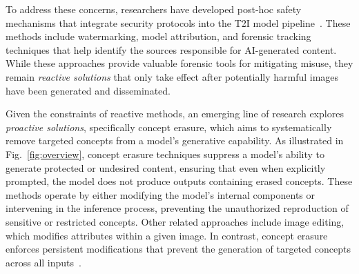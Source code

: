 To address these concerns, researchers have developed post-hoc safety mechanisms that integrate security protocols into the T2I model pipeline~\cite{WOUAF,stable_signature,kim2020decentralized,nie2023attributing,tree_ring}. These methods include watermarking, model attribution, and forensic tracking techniques that help identify the sources responsible for AI-generated content. While these approaches provide valuable forensic tools for mitigating misuse, they remain \textit{reactive solutions} that only take effect after potentially harmful images have been generated and disseminated. 


Given the constraints of reactive methods, an emerging line of research explores \textit{proactive solutions}, specifically concept erasure, which aims to systematically remove targeted concepts from a model’s generative capability. As illustrated in Fig.~\ref{fig:overview}, concept erasure techniques suppress a model’s ability to generate protected or undesired content, ensuring that even when explicitly prompted, the model does not produce outputs containing erased concepts. These methods operate by either modifying the model’s internal components or intervening in the inference process, preventing the unauthorized reproduction of sensitive or restricted concepts. 
Other related approaches include image editing, which modifies attributes within a given image. In contrast, concept erasure enforces persistent modifications that prevent the generation of targeted concepts across all inputs~\cite{Arad2023ReFACTUT}.



